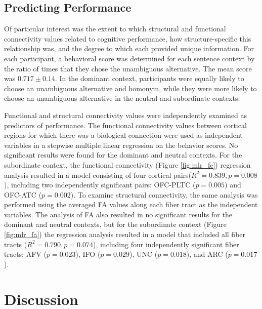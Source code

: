 \subsection{Predicting Performance}
Of particular interest was the extent to which structural and functional connectivity values related to cognitive performance, how structure-specific this relationship was, and the degree to which each provided unique information. For each participant, a behavioral score was determined for each sentence context by the ratio of times that they chose the unambiguous alternative. The mean score was $0.717 \pm 0.14$. In the dominant context, participants were equally likely to choose an unambiguous alternative and homonym, while they were more likely to choose an unambiguous alternative in the neutral and subordinate contexts. 

Functional and structural connectivity values were independently examined as predictors of performance. The functional connectivity values between cortical regions for which there was a biological connection were used as independent variables in a stepwise multiple linear regression on the behavior scores. No significant results were found for the dominant and neutral contexts. For the subordinate context, the functional connectivity (Figure \ref{fig:mlr_fc}) regression analysis resulted in a model consisting of four cortical pairs($R^2=0.839, p=0.008$), including two independently significant pairs: OFC-PLTC ($p=0.005$) and OFC-ATC ($p=0.002$). To examine structural connectivity, the same analysis was performed using the averaged FA values along each fiber tract as the independent variables.  The analysis of FA also resulted in no significant results for the dominant and neutral contexts, but for the subordinate context (Figure \ref{fig:mlr_fa}) the regression analysis resulted in a model that included all fiber tracts ($R^2=0.790, p=0.074$), including four independently significant fiber tracts: AFV ($p=0.023$), IFO ($p=0.029$), UNC ($p=0.018$), and ARC ($p=0.017$).

\section{Discussion}

